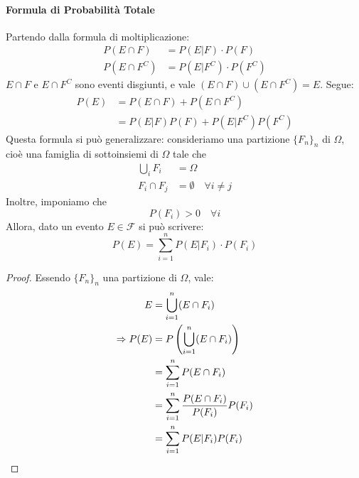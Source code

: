 \documentclass{article}
\theoremstyle{plain}
\theoremstyle{definition}
\theoremstyle{remark}
\begin{document}
\paragraph{Formula di Probabilità Totale} %
\label{par:formula_di_probabilità_totale}
Partendo dalla formula di moltiplicazione:
\begin{align*}
	P(E\cap F)&=P(E|F)\cdot P(F)\\
	P(E\cap F^C)&=P(E|F^C)\cdot P(F^C)
\end{align*}
$E\cap F$ e $E\cap F^C$ sono eventi disgiunti, e vale $(E\cap F)\cup(E\cap F^C)=E$. Segue:
\begin{align*}
	P(E)&=P(E\cap F)+P(E\cap F^C)\\
	&=P(E|F)P(F)+P(E|F^C)P(F^C)
\end{align*}
Questa formula si può generalizzare: consideriamo una partizione $\{F_n\}_n$ di $\Omega$, cioè una famiglia di sottoinsiemi di $\Omega$ tale che
\begin{align*}
	\bigcup_i F_i&=\Omega\\
	F_i\cap F_j&=\emptyset\quad\forall i\neq j
\end{align*}
Inoltre, imponiamo che
\begin{equation*}
	P(F_i)>0\quad\forall i
\end{equation*}
Allora, dato un evento $E\in\mathcal{F}$ si può scrivere:
\begin{equation*}
	P(E)=\sum_{i=1}^n P(E|F_i)\cdot P(F_i)
\end{equation*}
\begin{proof}
	Essendo $\{F_n\}_n$ una partizione di $\Omega$, vale:
	\begin{align*}
		E&=\bigcup_{i=1}^n (E\cap F_i)\\
		\Rightarrow P(E)&=P\left(\bigcup_{i=1}^n (E\cap F_i)\right)\\
		&=\sum_{i=1}^n P(E\cap F_i)\\
		&=\sum_{i=1}^n \frac{P(E\cap F_i)}{P(F_i)}P(F_i)\\
		&=\sum_{i=1}^n P(E|F_i)P(F_i)\qedhere
	\end{align*}
\end{proof}
\end{document}
